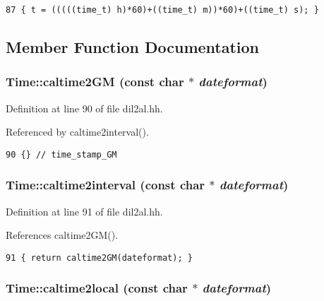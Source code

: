 \footnotesize\begin{verbatim}87 { t = (((((time_t) h)*60)+((time_t) m))*60)+((time_t) s); }
\end{verbatim}\normalsize 


\subsection{Member Function Documentation}
\subsubsection{ Time::caltime2GM (const char $\ast$ {\em dateformat})\hspace{0.3cm}{\tt  [inline]}}\label{classTime_a6}




Definition at line 90 of file dil2al.hh.

Referenced by caltime2interval().



\footnotesize\begin{verbatim}90 {} // time_stamp_GM
\end{verbatim}\normalsize 
{}
\subsubsection{ Time::caltime2interval (const char $\ast$ {\em dateformat})\hspace{0.3cm}{\tt  [inline]}}\label{classTime_a7}




Definition at line 91 of file dil2al.hh.

References caltime2GM().



\footnotesize\begin{verbatim}91 { return caltime2GM(dateformat); }
\end{verbatim}\normalsize 
{}
\subsubsection{ Time::caltime2local (const char $\ast$ {\em dateformat})}\label{classTime_a5}




